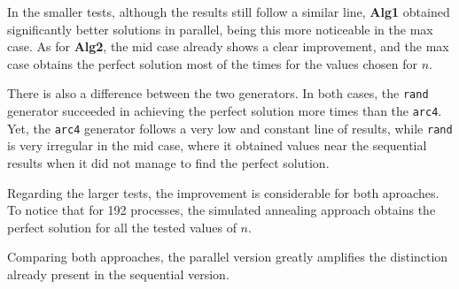 In the smaller tests, although the results still follow a similar line, \textbf{Alg1} obtained significantly better solutions in parallel, being this more noticeable in the max case. As for \textbf{Alg2}, the mid case already shows a clear improvement, and the max case obtains the perfect solution most of the times for the values chosen for $n$.

There is also a difference between the two generators. In both cases, the \texttt{rand} generator succeeded in achieving the perfect solution more times than the \texttt{arc4}. Yet, the \texttt{arc4} generator follows a very low and constant line of results, while \texttt{rand} is very irregular in the mid case, where it obtained values near the sequential results when it did not manage to find the perfect solution.

Regarding the larger tests, the improvement is considerable for both aproaches. To notice that for 192 processes, the simulated annealing approach obtains the perfect solution for all the tested values of $n$.

Comparing both approaches, the parallel version greatly amplifies the distinction already present in the sequential version.


